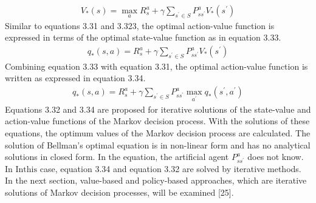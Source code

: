 \documentclass[12pt,twoside,a4]{mwbk}
\begin{document}
\begin{subequations}
\begin{align}
   V_{*}(s)=\max _{a} R_{s}^{a}+\gamma \sum_{s^{\prime} \in S} P_{s s^{\prime}}^{a} V_{*}\left(s^{\prime}\right)
\end{align}
\end{subequations}
Similar to equations 3.31 and 3.323, the optimal action-value function is expressed in terms of the optimal state-value function as in equation 3.33.
\begin{subequations}
\begin{align}
   q_{*}(s, a)=R_{s}^{a}+\gamma \sum_{s^{\prime} \in S} P_{s s^{\prime}}^{a} V_{*}\left(s^{\prime}\right)
\end{align}
\end{subequations}
Combining equation 3.33 with equation 3.31, the optimal action-value function is written as expressed in equation 3.34.
\begin{subequations}
\begin{align}
   q_{*}(s, a)=R_{s}^{a}+\gamma \sum_{s^{\prime} \in S} P_{s s^{\prime}}^{a} \max _{a^{\prime}} q_{*}\left(s^{\prime}, a^{\prime}\right)
\end{align}
\end{subequations}
Equations 3.32 and 3.34 are proposed for iterative solutions of the state-value and action-value functions of the Markov decision process. With the solutions of these equations, the optimum values of the Markov decision process are calculated. The solution of Bellman's optimal equation is in non-linear form and has no analytical solutions in closed form. In the equation, the artificial agent $P_{s s^{\prime}}^{a}$ does not know. In $\mathrm{In this}$ case, equation 3.34 and equation 3.32 are solved by iterative methods. In the next section, value-based and policy-based approaches, which are iterative solutions of Markov decision processes, will be examined [25].
\end{document}

